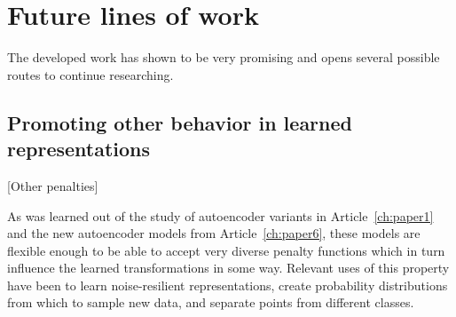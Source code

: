 

\section{Future lines of work}

The developed work has shown to be very promising and opens several possible routes to continue researching. 

\subsection{Promoting other behavior in learned representations}[Other penalties]

As was learned out of the study of autoencoder variants in Article~\ref{ch:paper1} and the new autoencoder models from Article~\ref{ch:paper6}, these models are flexible enough to be able to accept very diverse penalty functions which in turn influence the learned transformations in some way. Relevant uses of this property have been to learn noise-resilient representations, create probability distributions from which to sample new data, and separate points from different classes. 

